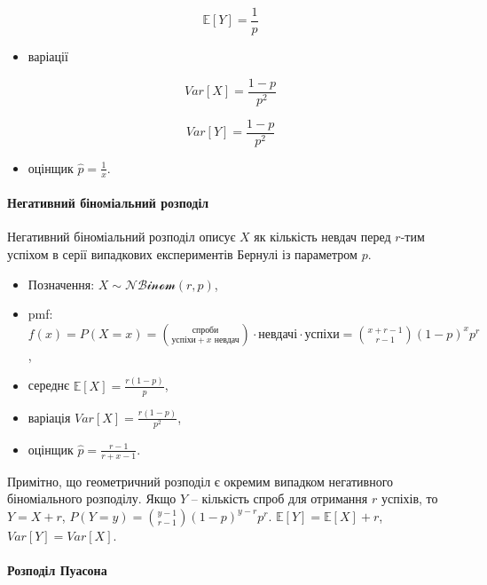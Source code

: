 \documentclass[
  11pt,
]{book}
\providecommand{\tightlist}{%
  \setlength{\itemsep}{0pt}\setlength{\parskip}{0pt}}
\begin{document}
\[\mathbb{E} [Y] = \frac{1}{p}\]

\begin{itemize}
\tightlist
\item
  варіації
\end{itemize}

\[Var[X] = \frac{1-p}{p^2}\]

\[Var[Y] = \frac{1-p}{p^2}\]

\begin{itemize}
\tightlist
\item
  оцінщик \(\hat{p} = \frac{1}{x}\).
\end{itemize}

\paragraph{Негативний біноміальний розподіл}\label{ux43dux435ux433ux430ux442ux438ux432ux43dux438ux439-ux431ux456ux43dux43eux43cux456ux430ux43bux44cux43dux438ux439-ux440ux43eux437ux43fux43eux434ux456ux43b}

Негативний біноміальний розподіл описує \(X\) як кількість невдач перед \(r\)-тим успіхом в серії випадкових експериментів Бернулі із параметром \(p\).

\begin{itemize}
\item
  Позначення: \(X \sim \mathcal{NBinom} (r, p)\),
\item
  pmf: \(f(x) = P(X = x) = \binom{\text{спроби}}{\text{успіхи} + x \text{ невдач}} \cdot \text{невдачі} \cdot \text{успіхи} = \binom{x + r - 1}{r-1} (1-p) ^x p^r\),
\item
  середнє \(\mathbb{E} [X] = \frac{r(1-p)}{p}\),
\item
  варіація \(Var[X] = \frac{r(1-p)}{p^2}\),
\item
  оцінщик \(\hat{p} = \frac{r-1}{r + x - 1}\).
\end{itemize}

Примітно, що геометричний розподіл є окремим випадком негативного біноміального розподілу. Якщо \(Y\) -- кількість спроб для отримання \(r\) успіхів, то \(Y = X + r\), \(P(Y = y) = \binom{y-1}{r-1} (1-p)^{y-r} p^r\). \(\mathbb{E}[Y] = \mathbb{E}[X] + r\), \(Var[Y] = Var[X]\).

\paragraph{Розподіл Пуасона}\label{ux440ux43eux437ux43fux43eux434ux456ux43b-ux43fux443ux430ux441ux43eux43dux430}
\end{document}
